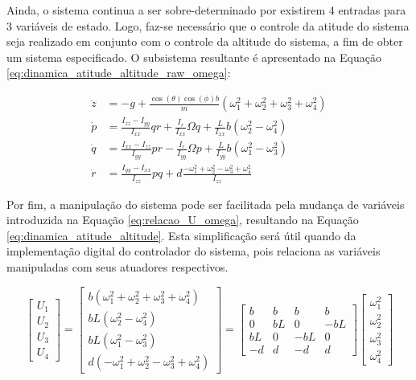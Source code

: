\documentclass[main.tex]{subfiles}
\begin{document}
Ainda, o sistema continua a ser sobre-determinado por existirem 4 entradas para 3 variáveis de estado. Logo, faz-se necessário que o controle da atitude do sistema seja realizado em conjunto com o controle da altitude do sistema, a fim de obter um sistema especificado. O subsistema resultante é apresentado na Equação \ref{eq:dinamica_atitude_altitude_raw_omega}:

\begin{equation}\label{eq:dinamica_atitude_altitude_raw_omega}
    \begin{split}
        \ddot{z} &= -g + \frac{\cos{(\theta)}\cos{(\phi)}b}{m}(\omega_1^2 + \omega_2^2 + \omega_3^2 + \omega_4^2)\\
        \dot{p} &= \frac{I_{zz} - I_{yy}}{I_{xx}}qr + \frac{I_r}{I_{xx}}\Omega q + \frac{L}{I_{xx}}b(\omega^2_2 - \omega^2_4)\\
        \dot{q} &= \frac{I_{xx} - I_{zz}}{I_{yy}}pr - \frac{I_r}{I_{yy}}\Omega p + \frac{L}{I_{yy}}b(\omega^2_1 - \omega^2_3)\\
        \dot{r} &= \frac{I_{yy} - I_{xx}}{I_{zz}}pq + d\frac{-\omega^2_1 + \omega^2_2 - \omega^2_3 + \omega^2_4}{I_{zz}}
    \end{split}
\end{equation}

Por fim, a manipulação do sistema pode ser facilitada pela mudança de variáveis introduzida na Equação \ref{eq:relacao_U_omega}, resultando na Equação \ref{eq:dinamica_atitude_altitude}. Esta simplificação será útil quando da implementação digital do controlador do sistema, pois relaciona as variáveis manipuladas com seus atuadores respectivos.

\begin{equation}\label{eq:relacao_U_omega}
    \begin{bmatrix}
        U_1\\U_2\\U_3\\U_4
    \end{bmatrix} = 
    \begin{bmatrix}
        b(\omega_1^2 + \omega_2^2 + \omega_3^2 + \omega_4^2)\\
        bL(\omega_2^2 - \omega_4^2)\\
        bL(\omega_1^2 - \omega_3^2)\\
        d(- \omega_1^2 + \omega_2^2 - \omega_3^2 + \omega_4^2)
    \end{bmatrix} = 
    \begin{bmatrix}
        b & b & b & b\\
        0 & bL & 0 & -bL\\
        bL & 0 & -bL & 0\\
        -d & d & -d & d
    \end{bmatrix}
    \begin{bmatrix}
        \omega_1^2\\
        \omega_2^2\\
        \omega_3^2\\
        \omega_4^2
    \end{bmatrix}
\end{equation}
\end{document}
